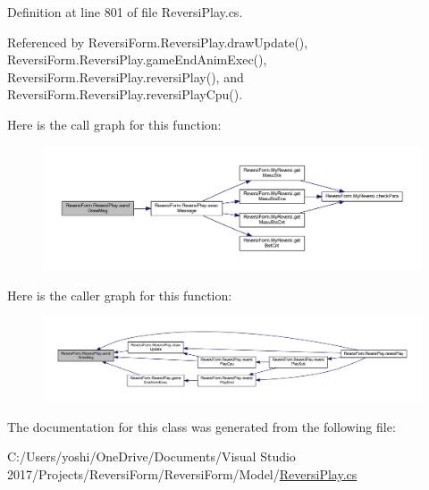 Definition at line 801 of file Reversi\+Play.\+cs.



Referenced by Reversi\+Form.\+Reversi\+Play.\+draw\+Update(), Reversi\+Form.\+Reversi\+Play.\+game\+End\+Anim\+Exec(), Reversi\+Form.\+Reversi\+Play.\+reversi\+Play(), and Reversi\+Form.\+Reversi\+Play.\+reversi\+Play\+Cpu().

Here is the call graph for this function\+:
\nopagebreak
\begin{figure}[H]
\begin{center}
\leavevmode
\includegraphics[width=350pt]{class_reversi_form_1_1_reversi_play_aaad592cdd92fb4efd6132c7cf1871e1f_cgraph}
\end{center}
\end{figure}
Here is the caller graph for this function\+:
\nopagebreak
\begin{figure}[H]
\begin{center}
\leavevmode
\includegraphics[width=350pt]{class_reversi_form_1_1_reversi_play_aaad592cdd92fb4efd6132c7cf1871e1f_icgraph}
\end{center}
\end{figure}


The documentation for this class was generated from the following file\+:\begin{DoxyCompactItemize}
\item 
C\+:/\+Users/yoshi/\+One\+Drive/\+Documents/\+Visual Studio 2017/\+Projects/\+Reversi\+Form/\+Reversi\+Form/\+Model/\hyperlink{_reversi_play_8cs}{Reversi\+Play.\+cs}\end{DoxyCompactItemize}
